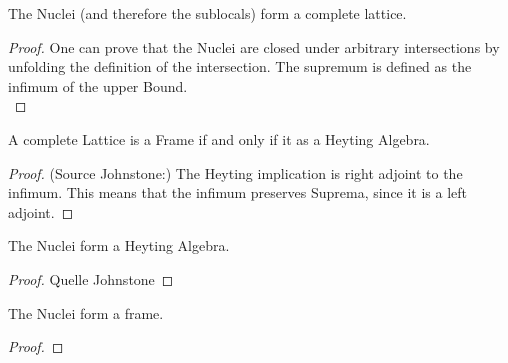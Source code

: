 \begin{lemma}
    \mathlibok
    \label{lem:nucleus_complete_lattice}
    \leanok
    The Nuclei (and therefore the sublocals) form a complete lattice.
\end{lemma}
\begin{proof}
    One can prove that the Nuclei are closed under arbitrary intersections by unfolding the definition of the intersection. The supremum is defined as the infimum of the upper Bound. \\
    \leanok
\end{proof}

\begin{proposition}
    \label{prop:complete_heyting_algebra}
    \mathlibok
    \leanok
    A complete Lattice is a Frame if and only if it as a Heyting Algebra.
\end{proposition}
\begin{proof}
(Source Johnstone:) The Heyting implication is right adjoint to the infimum. This means that the infimum preserves
Suprema, since it is a left adjoint.
    \leanok
        \mathlibok

\end{proof}


\begin{lemma}
    \label{lem:nucleus_heyting_algebra}
    \leanok
    \mathlibok
    The Nuclei form a Heyting Algebra.
\end{lemma}
\begin{proof}
    \leanok
    Quelle Johnstone
\end{proof}


\begin{lemma}
    \label{lem:nucleus_frame}
    \mathlibok
    \leanok
    The Nuclei  form a frame.
\end{lemma}
\begin{proof}
    \leanok
\end{proof}

